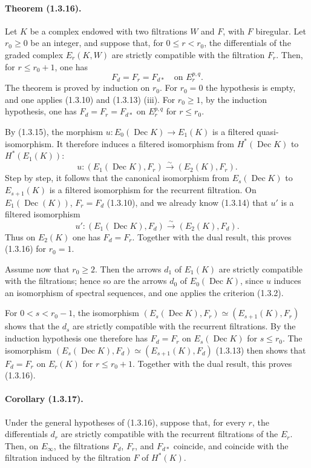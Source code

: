 \documentclass[10pt]{article}
\newcommand{\iso}{\xrightarrow{\sim}}
\newcommand{\Dec}{\operatorname{Dec}}
\begin{document}
\paragraph{Theorem (1.3.16).} Let $K$ be a complex endowed with two filtrations $W$ and $F$, with $F$ biregular. Let $r_0\ge0$ be an integer, and suppose that, for $0\le r<r_0$, the differentials of the graded complex $E_r(K,W)$ are strictly compatible with the filtration $F_r$. Then, for $r\le r_0+1$, one has
\[
F_d=F_r=F_{d*}\quad\text{on }E_r^{p,q}.
\]
The theorem is proved by induction on $r_0$. For $r_0=0$ the hypothesis is empty, and one applies (1.3.10) and (1.3.13) (iii). For $r_0\ge1$, by the induction hypothesis, one has $F_d=F_r=F_{d*}$ on $E_r^{p,q}$ for $r\le r_0$.

By (1.3.15), the morphism $u:E_0(\Dec K)\to E_1(K)$ is a filtered quasi-isomorphism. It therefore induces a filtered isomorphism from $H^*(\Dec K)$ to $H^*(E_1(K))$:
\[
u:(E_1(\Dec K),F_r)\iso(E_2(K),F_r).
\]
Step by step, it follows that the canonical isomorphism from $E_s(\Dec K)$ to $E_{s+1}(K)$ is a filtered isomorphism for the recurrent filtration. On $E_1(\Dec(K))$, $F_r=F_d$ (1.3.10), and we already know (1.3.14) that $u'$ is a filtered isomorphism
\[
u':(E_1(\Dec K),F_d)\iso(E_2(K),F_d).
\]
Thus on $E_2(K)$ one has $F_d=F_r$. Together with the dual result, this proves (1.3.16) for $r_0=1$.

Assume now that $r_0\ge2$. Then the arrows $d_1$ of $E_1(K)$ are strictly compatible with the filtrations; hence so are the arrows $d_0$ of $E_0(\Dec K)$, since $u$ induces an isomorphism of spectral sequences, and one applies the criterion (1.3.2).

For $0<s<r_0-1$, the isomorphism $(E_s(\Dec K),F_r)\simeq(E_{s+1}(K),F_r)$ shows that the $d_s$ are strictly compatible with the recurrent filtrations. By the induction hypothesis one therefore has $F_d=F_r$ on $E_s(\Dec K)$ for $s\le r_0$. The isomorphism $(E_s(\Dec K),F_d)\simeq(E_{s+1}(K),F_d)$ (1.3.13) then shows that $F_d=F_r$ on $E_r(K)$ for $r\le r_0+1$. Together with the dual result, this proves (1.3.16).

\paragraph{Corollary (1.3.17).} Under the general hypotheses of (1.3.16), suppose that, for every $r$, the differentials $d_r$ are strictly compatible with the recurrent filtrations of the $E_r$. Then, on $E_\infty$, the filtrations $F_d$, $F_r$, and $F_{d*}$ coincide, and coincide with the filtration induced by the filtration $F$ of $H^*(K)$.
\end{document}
